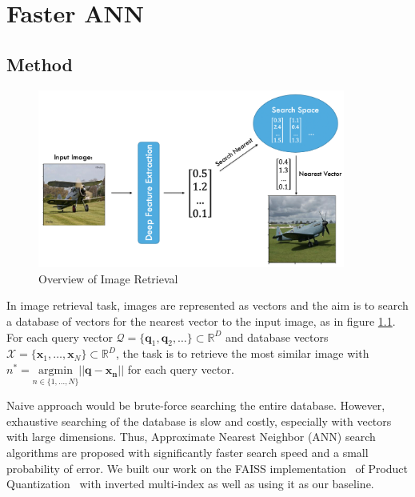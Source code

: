 
\lhead[\chaptername~\thechapter]{\rightmark}

\rhead[\leftmark]{}

\lfoot[\thepage]{}

\cfoot{}

\rfoot[]{\thepage}

\chapter{Faster ANN}
\label{FasterANN}

\section{Method}

\begin{figure}
    \centering
    \includegraphics[width=0.9\textwidth]{thesis/images/image_ret_exp-fig.png}
    \caption{Overview of Image Retrieval}
    \label{fig:ret-exp}
\end{figure}

In image retrieval task, images are represented as vectors and the aim is to search a database of vectors for the nearest vector to the input image, as in figure \ref{fig:ret-exp}. 
For each query vector $\mathcal{Q} = \{\bm{q}_1,\bm{q}_2,\dots\} \subset \mathbb{R}^D$ and database vectors $\mathcal{X} = \{\bm{x}_1, \dots, \bm{x}_N\} \subset \mathbb{R}^D$, the task is to retrieve the most similar image with $n^* = \underset{n\in\{{1,\dots,N}\}}{\mathrm{argmin}} \vert\vert \bm{q} - \bm{x_n} \vert\vert $ for each query vector. 

Naive approach would be brute-force searching the entire database.
However, exhaustive searching of the database is slow and costly, especially with vectors with large dimensions. 
Thus, Approximate Nearest Neighbor (ANN) search algorithms are proposed with significantly faster search speed and a small probability of error. 
We built our work on the FAISS implementation~\cite{faiss} of Product Quantization~\cite{jegou2010product} with inverted multi-index as well as using it as our baseline.

